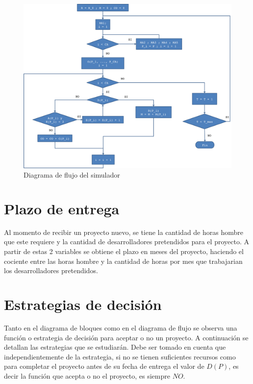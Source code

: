\begin{figure}[H]
\begin{center}
 \includegraphics[width=\textwidth,height=\textheight,keepaspectratio]{./images/flujo.png}
\end{center}

\caption{Diagrama de flujo del simulador}
\label{fig:flujo}
\end{figure}

\section{Plazo de entrega}
Al momento de recibir un proyecto nuevo, se tiene la cantidad de horas hombre que este requiere y la cantidad de desarrolladores pretendidos para el proyecto. A partir de estas 2 variables se obtiene el plazo en meses del proyecto, haciendo el cociente entre las horas hombre y la cantidad de horas por mes que trabajarian los desarrolladores pretendidos.


\section{Estrategias de decisión}

Tanto en el diagrama de bloques como en el diagrama de flujo se observa una función o estrategia de decisión para aceptar o no un proyecto. A continuación se detallan 
las estrategias que se estudiarán. Debe ser tomado en cuenta que independientemente de la estrategia, si no se tienen suficientes recursos como para completar el proyecto 
antes de su fecha de entrega el valor de $D(P)$, es decir la función que acepta o no el proyecto, es siempre $NO$.

